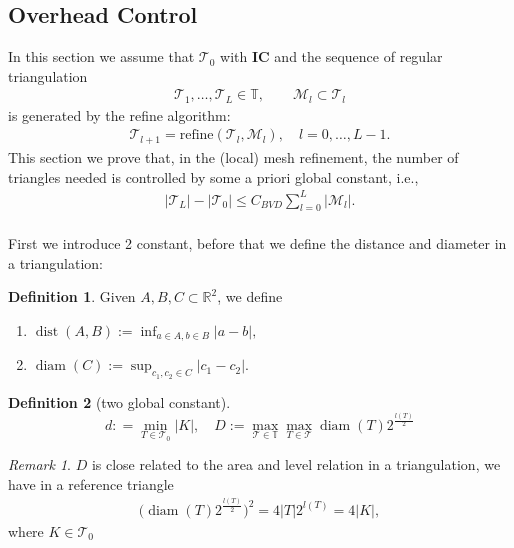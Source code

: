 \documentclass[a4paper,12pt,oneside,fleqn]{book}
\theoremstyle{definition}
\newtheorem{definition}{Definition}[section]
\theoremstyle{remark}
\newtheorem*{remark}{Remark}
\DeclareMathOperator*{\dist}{dist}
\DeclareMathOperator*{\diam}{diam}
\begin{document}
\subsection{Overhead Control}
In this section we assume that $\mathcal{T}_0$ with \textbf{IC} and the sequence of regular triangulation
	\begin{align*}
		\mathcal{T}_{1}, \dots, \mathcal{T}_L \in \mathbb{T}, \qquad \mathcal{M}_l \subset \mathcal{T}_l
	\end{align*}
	is generated by the refine algorithm:
	\begin{align*}
		\mathcal{T}_{l + 1} = \text{refine}(\mathcal{T}_l, \mathcal{M}_l), \quad l = 0, \dots, L -1.
	\end{align*}
This section we prove that, in the (local) mesh refinement,  the number of triangles needed is controlled by some a priori global constant, i.e., 
\begin{align*}
	|\mathcal{T}_L| - |\mathcal{T}_0| \le C_{BVD} \sum_{l = 0}^L |\mathcal{M}_l|.
\end{align*} 
\quad\\
First we introduce 2 constant, before that we define the distance and diameter in a triangulation:
\begin{definition}
	Given $A, B, C \subset \mathbb{R}^2$, we define
	\begin{enumerate}
		\item {} $\dist(A, B) := \inf_{a \in A, b \in B} |a - b|,$
		\item {} $\diam (C):= \sup_{c_1, c_2 \in C} |c_1 - c_2|$. 
	\end{enumerate}
\end{definition}
\begin{definition}[two global constant]
\begin{equation}
	d: = \min_{T \in \mathcal{T}_0} |K|, \quad D:= \max_{\mathcal{T} \in \mathbb{T}}\max_{T \in \mathcal{T}} \diam(T) 2^{\frac{l(T)}{2}}
\end{equation}
\end{definition}
\begin{remark}
	$D$ is close related to the area and level relation in a triangulation, we have in a reference triangle
	\begin{align*}
		\bigg( \diam(T) 2^{\frac{l(T)}{2}} \bigg)^2 = 4|T| 2^{l(T)} = 4 |K|,
	\end{align*}
	where $K \in \mathcal{T}_0$
\end{remark}
\end{document}
